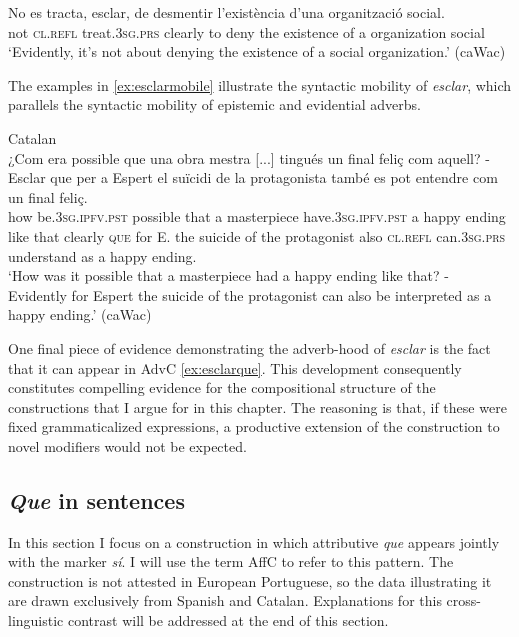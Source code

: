 		\ex
		 \gll No es tracta, {esclar}, de desmentir l'existència d'una organització social. \\  
		not \textsc{cl.refl} treat.\textsc{3sg.prs} clearly to deny {the existence} {of a} organization social\\
		\glt `Evidently, it's not about denying the existence of a social organization.' (caWac)
	\z
\z

The examples in \eqref{ex:esclarmobile} illustrate the syntactic mobility of \textit{esclar}, which parallels the syntactic mobility of epistemic and evidential adverbs.

\ea \label{ex:esclarque}Catalan\\
\gll  ¿Com era possible que una {obra mestra}  {[...]} tingués un {final feliç} com aquell? -{Esclar que} {per a} Espert el suïcidi de la protagonista també es pot entendre com un final feliç. \\
		how be.\textsc{3sg.ipfv.pst} possible that a masterpiece { } have.\textsc{3sg.ipfv.pst} a {happy ending} like that {clearly \textsc{que}} for E. the suicide of the protagonist also \textsc{cl.refl} can.\textsc{3sg.prs} understand as a happy ending.\\
		\glt `How was it possible that a masterpiece had a happy ending like that? - Evidently for Espert the suicide of the protagonist can also be interpreted as a happy ending.' (caWac)
\z 

One final piece of evidence demonstrating the adverb-hood of \textit{esclar} is the fact that it can appear  in AdvC \eqref{ex:esclarque}. This  development consequently  constitutes compelling evidence for the compositional structure of the constructions that I argue for in this chapter. The reasoning is that, if these were fixed grammaticalized expressions,  a productive extension of the construction to novel modifiers would not be expected.

\subsection{\emph{Que} in  sentences}\label{sec:presupaffc}
In this section I focus on a construction in which attributive \emph{que} appears jointly with the  marker \emph{sí}.  I will use  the term AffC to refer to this pattern. The construction is not attested in European Portuguese, so the data illustrating it are  drawn exclusively from Spanish and Catalan. Explanations for this cross-linguistic contrast will be addressed at the end of this section.

